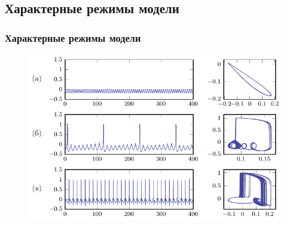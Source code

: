 \subsection{Характерные режимы модели}
\begin{frame}%
	\frametitle{Характерные режимы модели}
	\begin{figure}[h]
		\hspace{0em}
		\includegraphics[]{img/img_4}
	\end{figure}
	
\end{frame}
